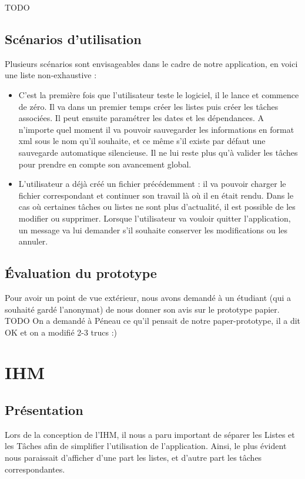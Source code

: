 	TODO
	

	\section{Scénarios d'utilisation}
		Plusieurs scénarios sont envisageables dans le cadre de notre application, en voici une liste non-exhaustive :
	
		\begin{itemize}
			\item C'est la première fois que l'utilisateur teste le logiciel, il le lance et commence de zéro. Il va dans un premier temps créer les listes puis créer les tâches associées. Il peut ensuite paramétrer les dates et les dépendances. A n'importe quel moment il va pouvoir sauvegarder les informations en format xml sous le nom qu'il souhaite, et ce même s'il existe par défaut une sauvegarde automatique silencieuse. Il ne lui reste plus qu'à valider les tâches pour prendre en compte son avancement global.
			\item L'utilisateur a déjà créé un fichier précédemment : il va pouvoir charger le fichier correspondant et continuer son travail là où il en était rendu. Dans le cas où certaines tâches ou listes ne sont plus d'actualité, il est possible de les modifier ou supprimer. Lorsque l'utilisateur va vouloir quitter l'application, un message va lui demander s'il souhaite conserver les modifications ou les annuler. 
		\end{itemize}
	
	
	\section{Évaluation du prototype}
		Pour avoir un point de vue extérieur, nous avons demandé à un étudiant (qui a souhaité gardé l'anonymat) de nous donner son avis sur le prototype papier. TODO
		On a demandé à Péneau ce qu'il pensait de notre paper-prototype, il a dit OK et on a modifié 2-3 trucs :)
		


\chapter{IHM}
	
	\section{Présentation}
	
		Lors de la conception de l'IHM, il nous a paru important de séparer les Listes et les Tâches afin de simplifier l'utilisation de l'application. Ainsi, le plus évident nous paraissait d'afficher d'une part les listes, et d'autre part les tâches correspondantes. 
		
